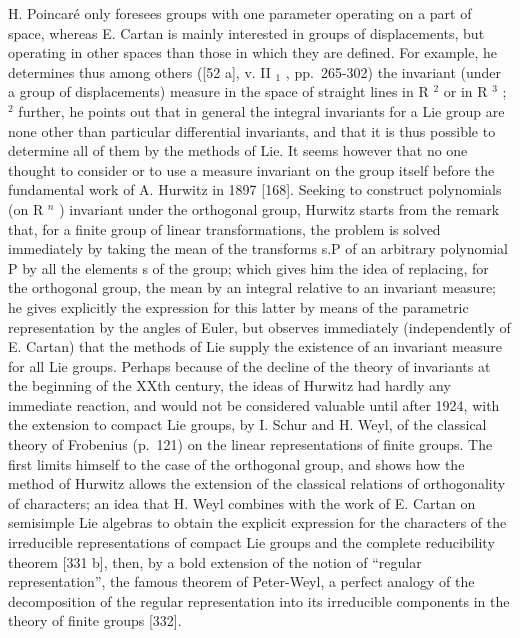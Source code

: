 H. Poincaré only foresees groups with one parameter operating on a part of space, whereas E. Cartan is mainly interested in groups of displacements, but operating in other spaces than those in which they are defined. For example, he determines thus among others ({[}52 a{]}, v. II \(_{1}\) , pp.~265-302) the invariant (under a group of displacements) measure in the space of straight lines in R \(^{2}\) or in R \(^{3}\) ; \(^{2}\) further, he points out that in general the integral invariants for a Lie group are none other than particular differential invariants, and that it is thus possible to determine all of them by the methods of Lie. It seems however that no one thought to consider or to use a measure invariant on the group itself before the fundamental work of A. Hurwitz in 1897 {[}168{]}. Seeking to construct polynomials (on R \(^{n}\) ) invariant under the orthogonal group, Hurwitz starts from the remark that, for a finite group of linear transformations, the problem is solved immediately by taking the mean of the transforms s.P of an arbitrary polynomial P by all the elements s of the group; which gives him the idea of replacing, for the orthogonal group, the mean by an integral relative to an invariant measure; he gives explicitly the expression for this latter by means of the parametric representation by the angles of Euler, but observes immediately (independently of E. Cartan) that the methods of Lie supply the existence of an invariant measure for all Lie groups. Perhaps because of the decline of the theory of invariants at the beginning of the XXth century, the ideas of Hurwitz had hardly any immediate reaction, and would not be considered valuable until after 1924, with the extension to compact Lie groups, by I. Schur and H. Weyl, of the classical theory of Frobenius (p.~121) on the linear representations of finite groups. The first limits himself to the case of the orthogonal group, and shows how the method of Hurwitz allows the extension of the classical relations of orthogonality of characters; an idea that H. Weyl combines with the work of E. Cartan on semisimple Lie algebras to obtain the explicit expression for the characters of the irreducible representations of compact Lie groups and the complete reducibility theorem {[}331 b{]}, then, by a bold extension of the notion of ``regular representation'', the famous theorem of Peter-Weyl, a perfect analogy of the decomposition of the regular representation into its irreducible components in the theory of finite groups {[}332{]}.

